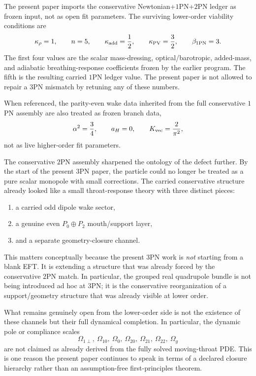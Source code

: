 \documentclass[11pt]{article}
\begin{document}
The present paper imports the conservative Newtonian+$1$PN+$2$PN ledger as
frozen input, not as open fit parameters.  The surviving lower-order viability
conditions are
\[
\kappa_\rho = 1,
\qquad
n = 5,
\qquad
\kappa_{\rm add}=\frac12,
\qquad
\kappa_{\rm PV}=\frac32,
\qquad
\beta_{\rm 1PN}=3.
\]
The first four values are the scalar mass-dressing, optical/barotropic,
added-mass, and adiabatic breathing-response coefficients frozen by the earlier
program.  The fifth is the resulting carried $1$PN ledger value.  The present
paper is not allowed to repair a $3$PN mismatch by retuning any of these
numbers.

When referenced, the parity-even wake data inherited from the full conservative
$1$PN assembly are also treated as frozen branch data,
\[
\alpha^2=\frac34,
\qquad
a_H=0,
\qquad
K_{\rm vec}=\frac{2}{\pi^2},
\]
not as live higher-order fit parameters.

The conservative $2$PN assembly sharpened the ontology of the defect further.
By the start of the present $3$PN paper, the particle could no longer be treated
as a pure scalar monopole with small corrections.  The carried conservative
structure already looked like a small throat-response theory with three distinct
pieces:
\begin{enumerate}
  \item a carried odd dipole wake sector,
  \item a genuine even $P_0\oplus P_2$ mouth/support layer,
  \item and a separate geometry-closure channel.
\end{enumerate}
This matters conceptually because the present $3$PN work is \emph{not} starting
from a blank EFT.  It is extending a structure that was already forced by the
conservative $2$PN match.  In particular, the grouped real quadrupole bundle is
not being introduced ad hoc at $3$PN; it is the conservative reorganization of a
support/geometry structure that was already visible at lower order.

What remains genuinely open from the lower-order side is not the existence of
these channels but their full dynamical completion.  In particular, the dynamic
pole or compliance scales
\[
\Omega_{1\perp},\ \Omega_{10},\ \Omega_0,
\ \Omega_{20},\ \Omega_{21},\ \Omega_{22},\ \Omega_g
\]
are not claimed as already derived from the fully solved moving-throat PDE.  This
is one reason the present paper continues to speak in terms of a declared closure
hierarchy rather than an assumption-free first-principles theorem.
\end{document}
